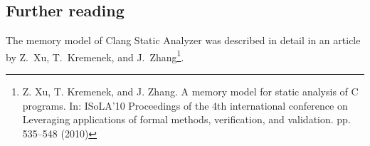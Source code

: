 \documentclass[a4paper,12pt]{article}
\begin{document}
\subsection{Further reading}

The memory model of Clang Static Analyzer was described in detail in an article by Z.~Xu, T.~Kremenek, and J.~Zhang\footnote{Z. Xu, T. Kremenek, and J. Zhang. A memory model for static analysis of C programs. In: ISoLA'10 Proceedings of the 4th international conference on Leveraging applications of formal methods, verification, and validation. pp. 535--548 (2010)}.

\printindex[notion]
\printindex
\end{document}
